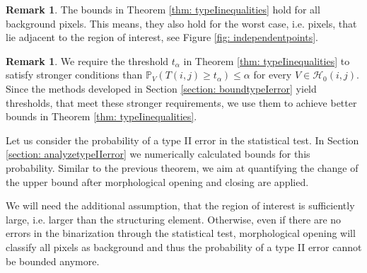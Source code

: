 \documentclass[a4paper,12pt]{article}
\theoremstyle{plain}
\theoremstyle{definition}
\newtheorem{remark}[theorem]{Remark}
\begin{document}
\begin{remark}
	The bounds in Theorem \ref{thm: typeIinequalities} hold for all background pixels. This means, they also hold for the worst case, i.e. pixels, that lie adjacent to the region of interest, see Figure \ref{fig: independentpoints}.
\end{remark}

\begin{remark}
	We require the threshold $t_\alpha$ in Theorem \ref{thm: typeIinequalities} to satisfy stronger conditions than $\mathbb{P}_V( T(i, j) \geq t_\alpha ) \leq \alpha$ for every $V \in \mathcal{H}_0(i, j)$. Since the methods developed in Section \ref{section: boundtypeIerror} yield thresholds, that meet these stronger requirements, we use them to achieve better bounds in Theorem \ref{thm: typeIinequalities}.
\end{remark}

Let us consider the probability of a type II error in the statistical test. In Section \ref{section: analyzetypeIIerror} we numerically calculated bounds for this probability. Similar to the previous theorem, we aim at quantifying the change of the upper bound after morphological opening and closing are applied.

We will need the additional assumption, that the region of interest is sufficiently large, i.e. larger than the structuring element. Otherwise, even if there are no errors in the binarization through the statistical test, morphological opening will classify all pixels as background and thus the probability of a type II error cannot be bounded anymore.
\end{document}
